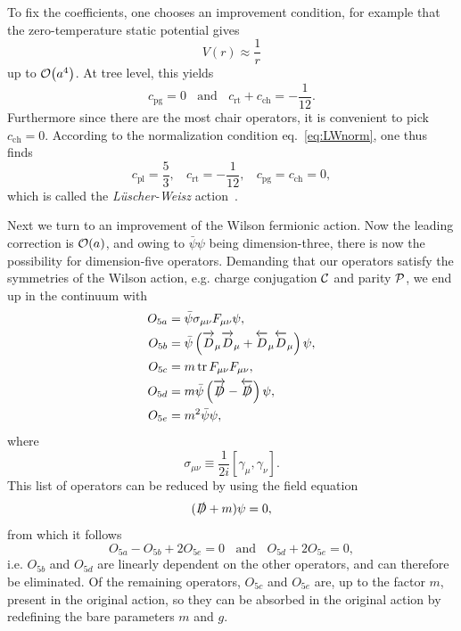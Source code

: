 To fix the coefficients, one chooses an improvement condition, for example
that the zero-temperature static potential gives
\begin{equation}
  V(r)\approx\frac{1}{r}
\end{equation}
up to $\order{a^4}$. At tree level, this yields 
\begin{equation}
  c_\text{pg}=0~~~~\text{and}~~~~c_\text{rt}+c_\text{ch}=-\frac{1}{12}.
\end{equation}
Furthermore since there are the most chair operators, it is convenient
to pick $c_\text{ch}=0$. According to the normalization condition
eq.~\eqref{eq:LWnorm}, one thus finds
\begin{equation}
  c_\text{pl}=\frac{5}{3},~~~~c_\text{rt}=-\frac{1}{12},~~~~
    c_\text{pg}=c_\text{ch}=0,
\end{equation}
which is called the {\it L\"uscher-Weisz} action~\cite{luscher_shell_1985}.

Next we turn to an improvement of the Wilson fermionic action. Now the leading
correction is $\order{a}$, and owing to $\bar{\psi}\psi$ being dimension-three,
there is now the possibility for dimension-five operators. Demanding that
our operators satisfy the symmetries of the Wilson action, e.g.
charge conjugation $\mathcal{C}$ and parity $\mathcal{P}$, we end up in the
continuum with 
\begin{equation}\begin{aligned}
  O_{5a}&=\bar\psi \sigma_{\mu\nu}F_{\mu\nu}\psi, \\
  O_{5b}&=\bar\psi\left(\overrightarrow{D\strut}_\mu\overrightarrow{D\strut}_\mu
                          +\overleftarrow{D\strut}_\mu\overleftarrow{D\strut}_\mu\right)\psi,\\ 
  O_{5c}&=m \tr F_{\mu\nu}F_{\mu\nu},\\
  O_{5d}&=m\bar\psi\left(\overrightarrow{\slashed{D}\strut}
                         -\overleftarrow{\slashed{D}\strut}\right)\psi,\\
  O_{5e}&=m^2 \bar\psi \psi,
\end{aligned}\end{equation}
where
\begin{equation}
  \sigma_{\mu\nu}\equiv\frac{1}{2i}[\gamma_\mu,\gamma_\nu].
\end{equation}
This list of operators can be reduced by using the field equation
\begin{equation}
 (\slashed{D}+m)\psi=0,
\end{equation}
from which it follows
\begin{equation}
  O_{5a}-O_{5b}+2O_{5e}=0~~~~\text{and}~~~~O_{5d}+2O_{5e}=0,
\end{equation}
i.e. $O_{5b}$ and $O_{5d}$ are linearly dependent on the other operators,
and can therefore be eliminated. Of the remaining operators, $O_{5c}$ and
$O_{5e}$ are, up to the factor $m$, present in the original action, so
they can be absorbed in the original action by redefining the bare
parameters $m$ and $g$.

